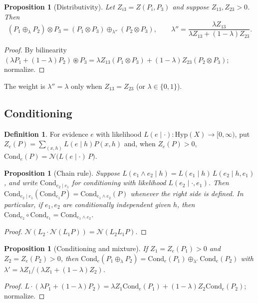 \documentclass[11pt]{article}
\newtheorem{proposition}[theorem]{Proposition}
\theoremstyle{definition}
\newtheorem{definition}[theorem]{Definition}
\theoremstyle{remark}
\newcommand{\Hyp}{\mathrm{Hyp}}
\newcommand{\Cond}{\mathrm{Cond}}
\newcommand{\N}{\mathcal{N}}
\newcommand{\cp}{\circledast}
\begin{document}
\begin{proposition}[Distributivity]\label{prop:distrib}
Let $Z_{i3}=Z(P_i,P_3)$ and suppose $Z_{13},Z_{23}>0$. Then
\[
(P_1\oplus_\lambda P_2)\otimes P_3=(P_1\otimes P_3)\oplus_{\lambda''}(P_2\otimes P_3),\qquad
\lambda''=\frac{\lambda Z_{13}}{\lambda Z_{13}+(1-\lambda)Z_{23}} .
\]
\end{proposition}
\begin{proof}
By bilinearity $(\lambda P_1+(1-\lambda)P_2)\cp P_3=\lambda Z_{13}(P_1\otimes P_3)+(1-\lambda)Z_{23}
(P_2\otimes P_3)$; normalize.
\end{proof}

The weight is $\lambda''=\lambda$ only when $Z_{13}=Z_{23}$ (or $\lambda\in\{0,1\}$).

\subsection{Conditioning}

\begin{definition}
For evidence $e$ with likelihood $L(e\mid\cdot)\colon\Hyp(X)\to[0,\infty)$, put
$Z_e(P)=\sum_{(x,h)}L(e\mid h)P(x,h)$ and, when $Z_e(P)>0$,
$\Cond_e(P)=\N\big(L(e\mid\cdot)\,P\big)$.
\end{definition}

\begin{proposition}[Chain rule]
Suppose $L(e_1\wedge e_2\mid h)=L(e_1\mid h)\,L(e_2\mid h,e_1)$, and write $\Cond_{e_2\mid e_1}$ for
conditioning with likelihood $L(e_2\mid\cdot,e_1)$. Then
$\Cond_{e_2\mid e_1}(\Cond_{e_1}P)=\Cond_{e_1\wedge e_2}(P)$ whenever the right side is defined. In
particular, if $e_1,e_2$ are conditionally independent given $h$, then
$\Cond_{e_2}\circ\Cond_{e_1}=\Cond_{e_1\wedge e_2}$.
\end{proposition}
\begin{proof}
$\N(L_2\cdot\N(L_1P))=\N(L_2L_1P)$.
\end{proof}

\begin{proposition}[Conditioning and mixture]
If $Z_1=Z_e(P_1)>0$ and $Z_2=Z_e(P_2)>0$, then
$\Cond_e(P_1\oplus_\lambda P_2)=\Cond_e(P_1)\oplus_{\lambda'}\Cond_e(P_2)$ with
$\lambda'=\lambda Z_1/(\lambda Z_1+(1-\lambda)Z_2)$.
\end{proposition}
\begin{proof}
$L\cdot(\lambda P_1+(1-\lambda)P_2)=\lambda Z_1\Cond_e(P_1)+(1-\lambda)Z_2\Cond_e(P_2)$; normalize.
\end{proof}
\end{document}
